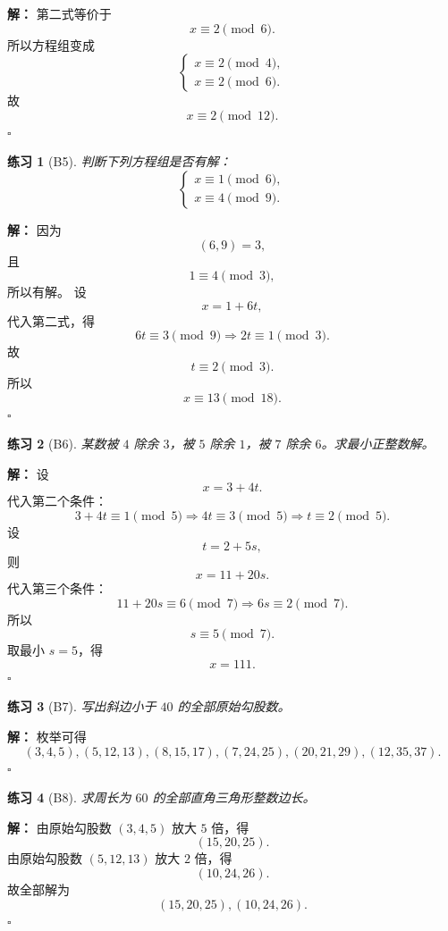 \documentclass[11pt,a4paper,fontset=fandol]{ctexart}
\theoremstyle{formaltheorem}
\theoremstyle{formalexample}
\newtheorem{exercise}{练习}[section]
\newenvironment{solution}{\par\noindent\textbf{解：}}{\hfill$\square$\par}
\begin{document}
\begin{solution}
第二式等价于
\[
x\equiv 2\pmod 6.
\]
所以方程组变成
\[
\begin{cases}
x\equiv 2\pmod 4,\\
x\equiv 2\pmod 6.
\end{cases}
\]
故
\[
\boxed{x\equiv 2\pmod{12}}.
\]
\end{solution}

\begin{exercise}[B5]
判断下列方程组是否有解：
\[
\begin{cases}
x\equiv 1\pmod 6,\\
x\equiv 4\pmod 9.
\end{cases}
\]
\end{exercise}

\begin{solution}
因为
\[
(6,9)=3,
\]
且
\[
1\equiv 4\pmod 3,
\]
所以有解。
设
\[
x=1+6t,
\]
代入第二式，得
\[
6t\equiv 3\pmod 9\Rightarrow 2t\equiv 1\pmod 3.
\]
故
\[
t\equiv 2\pmod 3.
\]
所以
\[
\boxed{x\equiv 13\pmod{18}}.
\]
\end{solution}

\begin{exercise}[B6]
某数被 $4$ 除余 $3$，被 $5$ 除余 $1$，被 $7$ 除余 $6$。求最小正整数解。
\end{exercise}

\begin{solution}
设
\[
x=3+4t.
\]
代入第二个条件：
\[
3+4t\equiv 1\pmod 5
\Rightarrow 4t\equiv 3\pmod 5
\Rightarrow t\equiv 2\pmod 5.
\]
设
\[
t=2+5s,
\]
则
\[
x=11+20s.
\]
代入第三个条件：
\[
11+20s\equiv 6\pmod 7
\Rightarrow 6s\equiv 2\pmod 7.
\]
所以
\[
s\equiv 5\pmod 7.
\]
取最小 $s=5$，得
\[
\boxed{x=111}.
\]
\end{solution}

\begin{exercise}[B7]
写出斜边小于 $40$ 的全部原始勾股数。
\end{exercise}

\begin{solution}
枚举可得
\[
\boxed{(3,4,5),(5,12,13),(8,15,17),(7,24,25),(20,21,29),(12,35,37)}.
\]
\end{solution}

\begin{exercise}[B8]
求周长为 $60$ 的全部直角三角形整数边长。
\end{exercise}

\begin{solution}
由原始勾股数 $(3,4,5)$ 放大 $5$ 倍，得
\[
(15,20,25).
\]
由原始勾股数 $(5,12,13)$ 放大 $2$ 倍，得
\[
(10,24,26).
\]
故全部解为
\[
\boxed{(15,20,25),(10,24,26)}.
\]
\end{solution}
\end{document}
